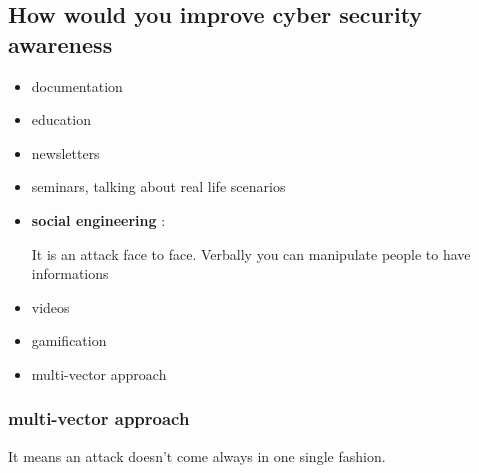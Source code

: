 \documentclass[a4paper,12pt]{article}
\begin{document}
\subsection {How would you improve cyber security awareness}
\begin{itemize}
\item documentation
\item education
\item newsletters
\item seminars, talking about real life scenarios
\item \textbf{social engineering}
:

It is an attack face to face. Verbally you can manipulate people to have informations
\item videos
\item gamification
\item multi-vector approach
\end{itemize}

\subsubsection{multi-vector approach}
It means an attack doesn't come always in one single fashion. 


\clearpage

\printindex
\end{document}
